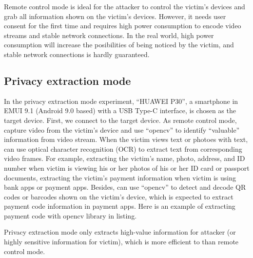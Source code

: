 Remote control mode is ideal for the attacker to control the victim's devices and grab all information shown on the victim's devices. However, it needs user consent for the first time and requires high power consumption to encode video streams and stable network connections.
In the real world, high power consumption will increase the posibilities of being noticed by the victim, and stable network connections is hardly guaranteed.


\subsection{Privacy extraction mode}

In the privacy extraction mode experiment, ``HUAWEI P30'', a smartphone in EMUI 9.1 (Android 9.0 based) with a USB Type-C interface, is chosen as the target device. 
First, we connect \tool to the target device. As remote control mode, \tool capture video from the victim's device and use ``opencv'' to identify ``valuable'' information from video stream. When the victim views text or photoes with text, \tool can use optical character recognition (OCR) to extract text from corresponding video frames. 
For example, extracting the victim's name, photo, address, and ID number when victim is viewing his or her photos of his or her ID card or passport documents,
extracting the victim's payment information when victim is using bank apps or payment apps. Besides, \tool can use ``opencv'' to detect and decode QR codes or barcodes shown on the victim's device, which is expected to extract payment code information in payment apps.
Here is an example of extracting payment code with opencv library in listing. 

Privacy extraction mode only extracts high-value information for attacker (or highly sensitive information for victim), which is more efficient to  than remote control mode.



